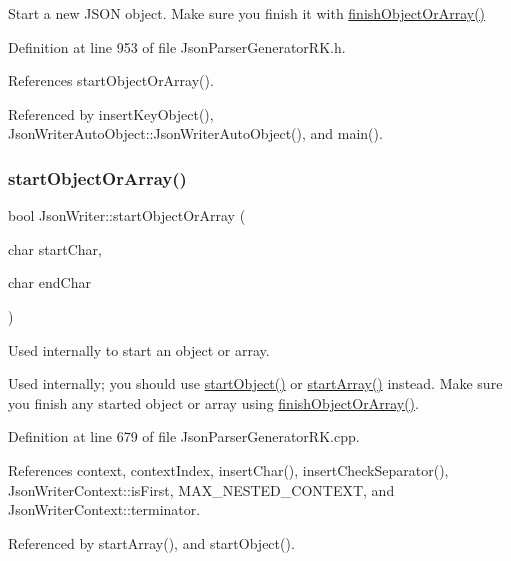 Start a new J\+S\+ON object. Make sure you finish it with \hyperlink{class_json_writer_adbd96b46b0679bea3a066c0e62bd86b0}{finish\+Object\+Or\+Array()} 



Definition at line 953 of file Json\+Parser\+Generator\+R\+K.\+h.



References start\+Object\+Or\+Array().



Referenced by insert\+Key\+Object(), Json\+Writer\+Auto\+Object\+::\+Json\+Writer\+Auto\+Object(), and main().

\mbox{\label{class_json_writer_a468e6c475bec83a7ec8cd7048cdbb31b}} 
\subsubsection{\texorpdfstring{start\+Object\+Or\+Array()}{startObjectOrArray()}}
{\footnotesize\ttfamily bool Json\+Writer\+::start\+Object\+Or\+Array (\begin{DoxyParamCaption}\item[{char}]{start\+Char,  }\item[{char}]{end\+Char }\end{DoxyParamCaption})}



Used internally to start an object or array. 

Used internally; you should use \hyperlink{class_json_writer_a43d1a78bf211a2f12cfe9253462717ae}{start\+Object()} or \hyperlink{class_json_writer_a7ccfcbf66a8ed9a2728e6f6ae4b705ec}{start\+Array()} instead. Make sure you finish any started object or array using \hyperlink{class_json_writer_adbd96b46b0679bea3a066c0e62bd86b0}{finish\+Object\+Or\+Array()}. 

Definition at line 679 of file Json\+Parser\+Generator\+R\+K.\+cpp.



References context, context\+Index, insert\+Char(), insert\+Check\+Separator(), Json\+Writer\+Context\+::is\+First, M\+A\+X\+\_\+\+N\+E\+S\+T\+E\+D\+\_\+\+C\+O\+N\+T\+E\+XT, and Json\+Writer\+Context\+::terminator.



Referenced by start\+Array(), and start\+Object().



